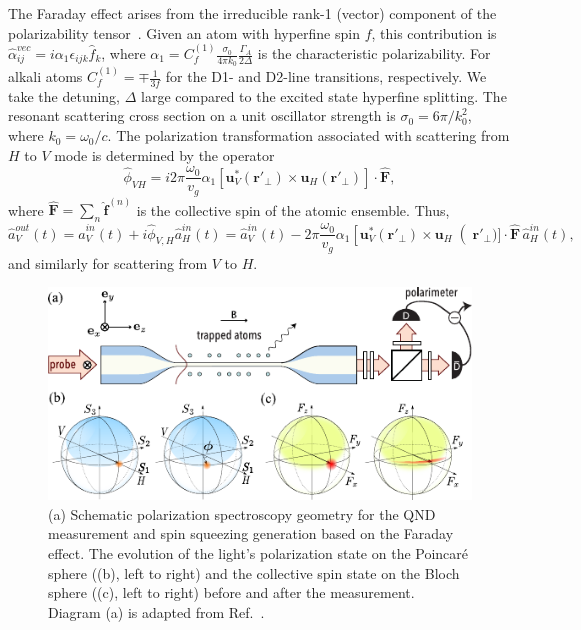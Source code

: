 \documentclass[preprint,aps,pra,onecolumn,superscriptaddress]{revtex4-1} %
\newcommand{\mbf}[1]{\mathbf{#1}}
\newcommand{\Poincare}{Poincar\'e\xspace}
\begin{document}
The Faraday effect arises from the irreducible rank-1 (vector) component of the polarizability tensor~\cite{Deutsch2010a}.  Given an atom with hyperfine spin $f$, this contribution is $\hat{\alpha}^{vec}_{ij} = i \alpha_1 \epsilon_{ijk} \hat{f}_k$, where {\color{blue} $\alpha_1 = C^{(1)}_{f}\frac{\sigma_0}{4\pi k_0}\frac{\Gamma_A}{2\Delta} $ is the characteristic polarizability.  For alkali atoms $C^{(1)}_f=\mp\frac{1}{3f}$ for the D1- and D2-line transitions, respectively.  We take the detuning, $ \Delta $ large compared to the excited state hyperfine splitting.}  The resonant scattering cross section on a unit oscillator strength is $\sigma_0 = 6\pi/k_0^2$, where $k_0=\omega_0/c$.  The polarization transformation associated with scattering from $H$ to $V$ mode is determined by the operator
\begin{equation}
\hat{\phi}_{VH} = i 2\pi \frac{\omega_0}{v_g}\alpha_1 \left[ \mbf{u}^*_V (\mbf{r}'_\perp) \times  \mbf{u}_{H} (\mbf{r}'_\perp) \right] \cdot \hat{\mbf{F}},
\end{equation}
where $\hat{\mbf{F}}=\sum_n \hat{\mbf{f}}^{(n)}$ is the collective spin of the atomic ensemble.  Thus,
\begin{equation}\label{eq:aoutain}
\hat{a}^{out}_V(t) = \hat{a}^{in}_V(t)  +i  \hat{\phi}_{V,H} \hat{a}^{in}_{H}(t)= \hat{a}^{in}_V(t)  - 2\pi \frac{\omega_0}{v_g}\alpha_1 \left[ \mbf{u}^*_V (\mbf{r}'_\perp) \times  \mbf{u}_{H}\right(\mbf{r}'_\perp)]  \cdot \hat{\mbf{F}}\, \hat{a}^{in}_{H}(t),
\end{equation}
 and similarly for scattering from $V$ to $H$.

\begin{figure}[htb]
\centering
  \includegraphics[width=.45\textwidth]{fig/FaradaySchematics}
  \caption{(a) Schematic polarization spectroscopy geometry for the QND measurement and spin squeezing generation based on the Faraday effect.  The evolution of the light's polarization state on the \Poincare sphere ((b), left to right) and the collective spin state on the Bloch sphere ((c), left to right) before and after the measurement. Diagram (a) is adapted from Ref.~\cite{Qi2016}.}\label{fig:spinsqueezingschematic}
\end{figure}
\end{document}
